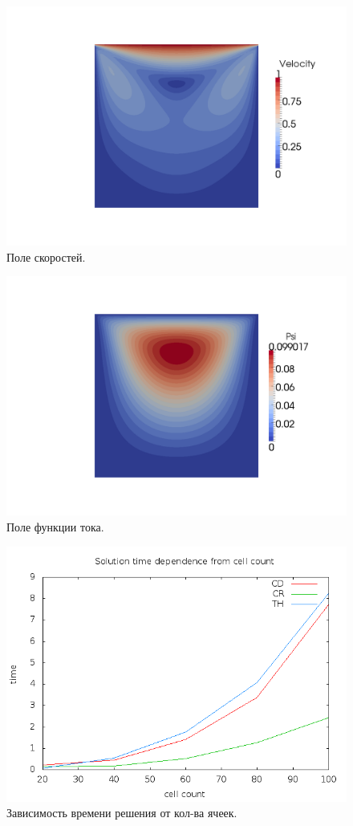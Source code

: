 \documentclass[12pt]{article}
\begin{document}
\begin{figure}
\includegraphics[scale=0.1]{pics/velocity}
\caption{Поле скоростей.}
\label{fg:velocity}
\end{figure}

\begin{center}
  \begin{figure}
    \includegraphics[scale=0.4]{pics/psi}
    \caption{Поле функции тока.}
    \label{fg:psi}
  \end{figure}
\end{center}

\begin{figure}
\includegraphics[scale=0.1]{pics/time}
\caption{Зависимость времени решения от кол-ва ячеек.}
\label{fg:time}
\end{figure}
\end{document}
